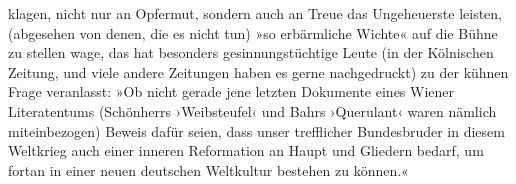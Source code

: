                klagen, nicht nur an Opfermut, sondern auch an Treue das Ungeheuerste leisten,
               (abgesehen von denen, die es nicht tun) »so erbärmliche Wichte« auf die Bühne zu
               stellen wage, das hat besonders gesinnungstüchtige Leute (in der Kölnischen Zeitung, und viele andere Zeitungen haben es gerne
               nachgedruckt) zu der kühnen Frage veranlasst: »Ob nicht gerade jene letzten Dokumente eines Wiener Literatentums (Schön{\pb}herrs ›Weibsteufel‹ und Bahrs
                     ›Querulant‹ waren nämlich miteinbezogen)
                  Beweis dafür seien, dass unser trefflicher Bundesbruder in diesem Weltkrieg auch
                  einer inneren Reformation an Haupt und Gliedern bedarf, um fortan in einer neuen
                  deutschen Weltkultur bestehen zu können.«\pend
           
